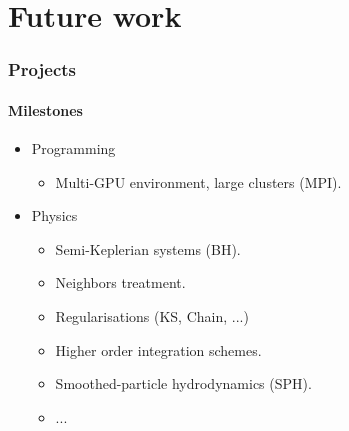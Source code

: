 \section{Future work}
\begin{frame}
    \frametitle{Projects}
    \framesubtitle{Milestones}

    \begin{itemize}
        \item Programming
        \begin{itemize}
            \item Multi-GPU environment, large clusters (MPI).
        \end{itemize}
        \item Physics
        \begin{itemize}
            \item Semi-Keplerian systems (BH).
            \item Neighbors treatment.
            \item Regularisations (KS, Chain, ...)
            \item Higher order integration schemes.
            \item Smoothed-particle hydrodynamics (SPH).
            \item ...
        \end{itemize}
    \end{itemize}
\end{frame}
